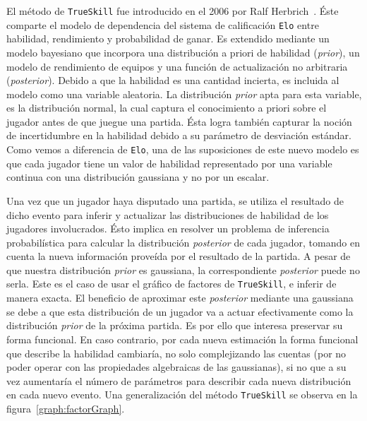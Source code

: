 \documentclass[11pt,twoside,spanish]{report} %
\begin{document}
El m\'etodo de  \texttt{TrueSkill}  fue introducido en el 2006 por Ralf Herbrich~\cite{Herbrich2007}.
\'Este comparte el modelo de dependencia del sistema de calificaci\'on \texttt{Elo} entre habilidad, rendimiento y probabilidad de ganar.
Es extendido mediante un modelo bayesiano que incorpora una distribuci\'on a priori de habilidad (\textit{prior}), un modelo de rendimiento de equipos y una funci\'on de actualizaci\'on no arbitraria (\textit{posterior}).
Debido a que la habilidad es una cantidad incierta,  es incluida al modelo como una variable aleatoria.
La distribuci\'on  \textit{prior} apta para esta variable, es la distribuci\'on normal, la cual captura el conocimiento a priori sobre el jugador antes de que juegue una partida.
\'Esta logra tambi\'en capturar la noci\'on de incertidumbre en la habilidad debido a su par\'ametro de desviaci\'on est\'andar.
Como vemos a diferencia de \texttt{Elo}, una de las suposiciones de este nuevo modelo es que cada jugador tiene un valor de habilidad representado por una variable continua con una distribuci\'on gaussiana y no por un escalar.

Una vez que un jugador haya disputado una partida, se utiliza el resultado de dicho evento para inferir y actualizar las distribuciones de habilidad de los jugadores involucrados.
\'Esto implica en resolver un problema de inferencia probabil\'istica para calcular la distribuci\'on \textit{posterior}  de cada jugador,  tomando en cuenta la nueva informaci\'on prove\'ida por el resultado de la partida.
A pesar de que nuestra distribuci\'on \textit{prior} es gaussiana, la correspondiente \textit{posterior} puede no serla.
Este es el caso de usar el gr\'afico de factores de \texttt{TrueSkill}, e inferir de manera exacta.
El beneficio de aproximar este \textit{posterior} mediante una gaussiana se debe a que esta distribuci\'on de un jugador va a actuar efectivamente como la distribuci\'on \textit{prior} de la pr\'oxima partida.
Es por ello que interesa preservar su forma funcional.
En caso contrario, por cada nueva estimaci\'on la forma funcional que describe la habilidad cambiar\'ia, no solo complejizando las cuentas (por no poder operar con las propiedades algebraicas de las gaussianas), si no que a su vez aumentar\'ia el n\'umero de par\'ametros para describir cada nueva distribuci\'on en cada nuevo evento.
Una generalizaci\'on del  m\'etodo  \texttt{TrueSkill} se observa en la figura~\ref{graph:factorGraph}.
\end{document}
